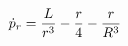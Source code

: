 \documentclass[preview]{standalone}
\begin{document}
\begin{align*}
\dot{p}_r={ L \over r^3}-\frac{r}{4}-\frac{r}{R^3}
\end{align*}
\end{document}
